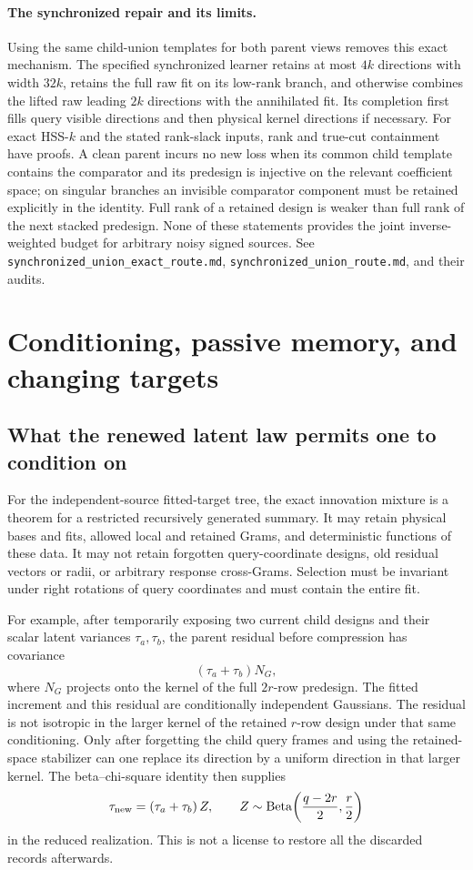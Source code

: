 \documentclass[11pt,oneside,openany,a4paper]{book}
\numberwithin{equation}{chapter}
\theoremstyle{definition}
\theoremstyle{remark}
\newcommand{\sourcefile}[1]{{\small\nolinkurl{#1}}}
\begin{document}
\paragraph{The synchronized repair and its limits.}
Using the same child-union templates for both parent views removes
this exact mechanism.  The specified synchronized learner retains at
most $4k$ directions with width $32k$, retains the full raw fit on its
low-rank branch, and otherwise combines the lifted raw leading $2k$
directions with the annihilated fit.  Its completion first fills query
visible directions and then physical kernel directions if necessary.
For exact HSS-$k$ and the stated rank-slack inputs, rank and true-cut
containment have proofs.  A clean parent incurs no new loss when its
common child template contains the comparator and its predesign is
injective on the relevant coefficient space; on singular branches an
invisible comparator component must be retained explicitly in the
identity.  Full rank of a retained design is weaker than full rank of
the next stacked predesign.  None of these statements provides the
joint inverse-weighted budget for arbitrary noisy signed sources.
See \sourcefile{synchronized_union_exact_route.md},
\sourcefile{synchronized_union_route.md}, and their audits.

\section{Conditioning, passive memory, and changing targets}
\label{upd:sec:later-conditioning}

\subsection{What the renewed latent law permits one to condition on}

For the independent-source fitted-target tree, the exact innovation
mixture is a theorem for a restricted recursively generated summary.
It may retain physical bases and fits, allowed local and retained
Grams, and deterministic functions of these data.  It may not retain
forgotten query-coordinate designs, old residual vectors or radii, or
arbitrary response cross-Grams.  Selection must be invariant under
right rotations of query coordinates and must contain the entire fit.

For example, after temporarily exposing two current child designs and
their scalar latent variances $\tau_a,\tau_b$, the parent residual
before compression has covariance
\[
 (\tau_a+\tau_b)N_G,
\]
where $N_G$ projects onto the kernel of the full $2r$-row predesign.
The fitted increment and this residual are conditionally independent
Gaussians.  The residual is not isotropic in the larger kernel of the
retained $r$-row design under that same conditioning.  Only after
forgetting the child query frames and using the retained-space
stabilizer can one replace its direction by a uniform direction in
that larger kernel.  The beta--chi-square identity then supplies
\[
 \tau_{\rm new}=(\tau_a+\tau_b)\,Z,\qquad
 Z\sim\operatorname{Beta}\!\left(\frac{q-2r}{2},\frac r2\right)
\]
in the reduced realization.  This is not a license to restore all the
discarded records afterwards.
\end{document}
